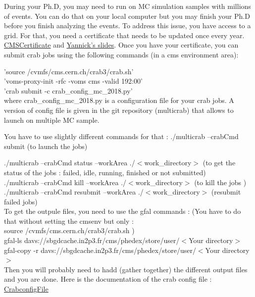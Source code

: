 \documentclass[reprint, a4paper, nofootinbib, amsmath, amssymb, aps]{revtex4-1}
\begin{document}
 During your Ph.D, you may need to run on MC simulation samples with millions of events. You can do that on your local computer but you may finish your Ph.D  before you finish analyzing the events. To address this issue, you have access to a grid. For that, you need a certificate that needs to be updated once every year. \href{https://twiki.cern.ch/twiki/bin/view/CMSPublic/WorkBookChapter5}{CMSCertificate} and \href{https://indico.in2p3.fr/event/32895/}{Yannick's slides}. Once you have your certificate, you can submit crab jobs using the following commands (in a cms environment area): 
 
'source /cvmfs/cms.cern.ch/crab3/crab.sh' \\
'voms-proxy-init -rfc -voms cms -valid 192:00'\\
'crab submit -c crab\_config\_mc\_2018.py' \\

where crab\_config\_mc\_2018.py is a configuration file for your crab jobs. A version of config file is given in the git repository (multicrab) that allows to launch on multiple  MC sample.

You have to use slightly different commands for that :
./multicrab --crabCmd submit (to launch the jobs)

./multicrab --crabCmd status --workArea ./$<$work\_directory$>$ (to get the status of the jobs : failed, idle, running, finished or not submitted)\\
./multicrab --crabCmd kill --workArea ./$<$work\_directory$>$ (to kill the jobs )\\
./multicrab --crabCmd resubmit --workArea ./$<$work\_directory$>$ (resubmit failed jobs)\\

To get the outpule files, you need to use the gfal commands :
(You have to do that without setting the cmsenv but only :\\
source /cvmfs/cms.cern.ch/crab3/crab.sh )\\
gfal-ls davs://sbgdcache.in2p3.fr/cms/phedex/store/user/$<$Your directory$>$\\
gfal-copy -r davs://sbgdcache.in2p3.fr/cms/phedex/store/user/$<$Your directory$>$ \\
Then you will probably need to hadd (gather together) the different output files and you are done.
Here is the documentation of the crab config file : \\
\href{https://twiki.cern.ch/twiki/bin/view/CMSPublic/CRAB3ConfigurationFile}{CrabconfigFile}
\end{document}

